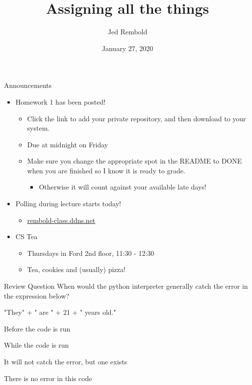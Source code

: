 \documentclass[pdf, aspectratio=169, 12pt]{beamer}
\title{Assigning all the things}
\author{Jed Rembold}
\date{January 27, 2020}
\begin{document}
\begin{frame}{Announcements}
	\begin{itemize}
		\item Homework 1 has been posted!
			\begin{itemize}
				\item Click the link to add your private repository, and then download to your system.
				\item Due at midnight on Friday
				\item Make sure you change the appropriate spot in the README to DONE when you are finished so I know it is ready to grade.
					\begin{itemize}
						\item Otherwise it will count against your available late days!
					\end{itemize}
			\end{itemize}
		\item Polling during lecture starts today!
			\begin{itemize}
				\item \url{rembold-class.ddns.net}
			\end{itemize}
		\item CS Tea
			\begin{itemize}
				\item Thursdays in Ford 2nd floor, 11:30 - 12:30
				\item Tea, cookies and (usually) pizza!
			\end{itemize}
	\end{itemize}
\end{frame}

\begin{frame}[fragile]{Review Question}
	When would the python interpreter generally catch the error in the expression below?

	\begin{pythoncode}
		"They" + " are " + 21 + " years old."
	\end{pythoncode}

	\vspace{5mm}
	\begin{poll}
		\item Before the code is run
		\item While the code is run
		\item It will not catch the error, but one exists
		\item There is no error in this code
	\end{poll}
\end{frame}
\end{document}
